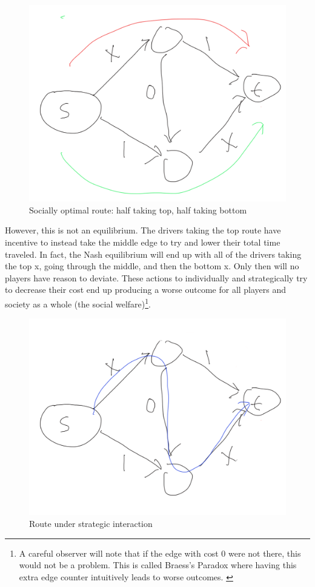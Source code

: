 \documentclass[12pt,twoside]{reedthesis}
\begin{document}
\begin{figure}[h!]
	\centering
	\includegraphics[scale=0.4]{Figures/braess_2}
	\caption{Socially optimal route: half taking top, half taking bottom}
	\label{braess2}
\end{figure}

However, this is not an equilibrium. The drivers taking the top route have incentive to instead take the middle edge to try and lower their total time traveled. In fact, the Nash equilibrium will end up with all of the drivers taking the top x, going through the middle, and then the bottom x. Only then will no players have reason to deviate. These actions to individually and strategically try to decrease their cost end up producing a worse outcome for all players and society as a whole (the social welfare)\footnote{A careful observer will note that if the edge with cost 0 were not there, this would not be a problem. This is called Braess's Paradox where having this extra edge counter intuitively leads to worse outcomes. \citep{Roughgarden2016}}.  

\begin{figure}[h!]
	\centering
	\includegraphics[scale=0.4]{Figures/braess_3}
	\caption{Route under strategic interaction}
	\label{braess3}
\end{figure}
\end{document}
